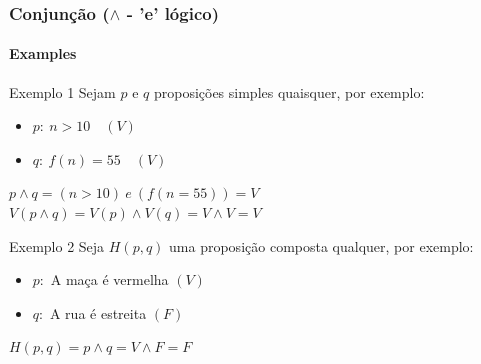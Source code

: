 \documentclass[10pt, headsepline, captions=tableabove,xcolor=table]{beamer}
\begin{document}
%
\begin{frame}[t]
    \frametitle{Conjunção ($\land$ - 'e' lógico)}
    \framesubtitle{Examples}
    \begin{exampleblock}{Exemplo 1}
        Sejam $p$ e $q$ proposições simples quaisquer, por exemplo:
        \begin{itemize}
            \item $p:~n > 10 \quad (V)$
            \item $q:~f(n) = 55 \quad (V)$
        \end{itemize}
        $p \land q = (n >10)~e~(f(n = 55)) = V$ \\[2pt]
        $V(p \land q) = V(p) \land V(q) = V \land V = V$
    \end{exampleblock}
    \begin{exampleblock}{Exemplo 2}
        Seja $H(p,q)$ uma proposição composta qualquer, por exemplo:
        \begin{itemize}
            \item $p:$ A maça é vermelha $(V)$
            \item $q:$ A rua é estreita  $(F)$
        \end{itemize}
        $H(p,q) = p \land q = V \land F = F$
    \end{exampleblock}
\end{frame}
%
\end{document}
